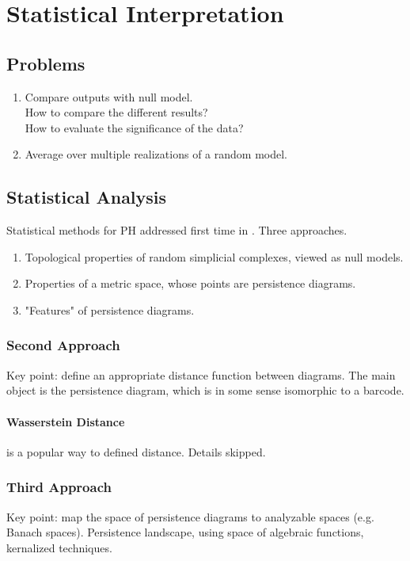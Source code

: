 \documentclass[10pt,a4paper]{article}
\begin{document}
\section{Statistical Interpretation}
\subsection{Problems}
\begin{enumerate}
	\item Compare outputs with null model.\\
	How to compare the different results?\\
	How to evaluate the significance of the data?
	\item Average over multiple realizations of a random model.
\end{enumerate}
\subsection{Statistical Analysis}
Statistical methods for PH addressed first time in \cite{Bubenik2007}. Three approaches.
\begin{enumerate}
	\item Topological properties of random simplicial complexes, viewed as null models.
	\item Properties of a metric space, whose points are persistence diagrams.
	\item "Features" of persistence diagrams.
\end{enumerate}
\subsubsection{Second Approach}
Key point: define an appropriate distance function between diagrams. The main object is the persistence diagram, which is in some sense isomorphic to a barcode.
\paragraph{Wasserstein Distance} is a popular way to defined distance. Details skipped.
\subsubsection{Third Approach}
Key point: map the space of persistence diagrams to analyzable spaces (e.g. Banach spaces). Persistence landscape\cite{Bubenik2015}, using space of algebraic functions\cite{Adcock2013}, kernalized techniques.
\end{document}
